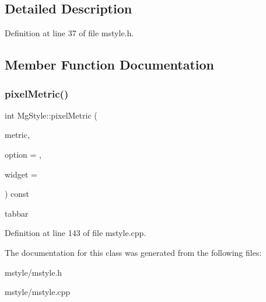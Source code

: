 \subsection{Detailed Description}


Definition at line 37 of file mstyle.\+h.



\subsection{Member Function Documentation}
\mbox{\label{class_mg_style_af9090dfb05c3d8874a57eb237363b111}} 
\subsubsection{\texorpdfstring{pixel\+Metric()}{pixelMetric()}}
{\footnotesize\ttfamily int Mg\+Style\+::pixel\+Metric (\begin{DoxyParamCaption}\item[{Pixel\+Metric}]{metric,  }\item[{const Q\+Style\+Option $\ast$}]{option = {},  }\item[{const Q\+Widget $\ast$}]{widget = {} }\end{DoxyParamCaption}) const\hspace{0.3cm}{\ttfamily [virtual]}}

tabbar 

Definition at line 143 of file mstyle.\+cpp.



The documentation for this class was generated from the following files\+:\begin{DoxyCompactItemize}
\item 
mstyle/mstyle.\+h\item 
mstyle/mstyle.\+cpp\end{DoxyCompactItemize}
